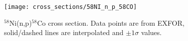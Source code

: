 \begin{figure}[htb]
\texttt{[image: cross\_sections/58NI\_n\_p\_58CO]}
\caption{$^{58}$Ni(n,p)$^{58}$Co cross section.  Data points are from EXFOR, solid/dashed lines are interpolated and $\pm 1\sigma$ values.
}
\label{fig:58NI_n_p_58CO}
\end{figure}
